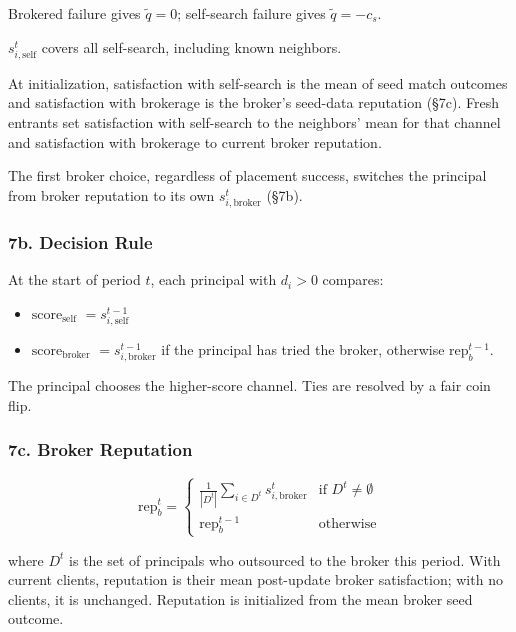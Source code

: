 \documentclass[11pt]{article}
\providecommand{\tightlist}{%
  \setlength{\itemsep}{0pt}\setlength{\parskip}{0pt}}
\begin{document}
Brokered failure gives \(\tilde{q}=0\); self-search failure gives \(\tilde{q}=-c_s\).

\(s_{i,\text{self}}^t\) covers all self-search, including known neighbors.

At initialization, satisfaction with self-search is the mean of seed match outcomes and satisfaction with brokerage is the broker's seed-data reputation (§7c). Fresh entrants set satisfaction with self-search to the neighbors' mean for that channel and satisfaction with brokerage to current broker reputation.

The first broker choice, regardless of placement success, switches the principal from broker reputation to its own \(s_{i,\text{broker}}^t\) (§7b).

\subsubsection{7b. Decision Rule}\label{b.-decision-rule}

At the start of period \(t\), each principal with \(d_i > 0\) compares:

\begin{itemize}
\tightlist
\item \textbf{\(\text{score}_{\text{self}}\)} \(= s_{i,\text{self}}^{t-1}\)
\item \textbf{\(\text{score}_{\text{broker}}\)} \(= s_{i,\text{broker}}^{t-1}\) if the principal has tried the broker, otherwise \(\text{rep}_b^{t-1}\).
\end{itemize}

The principal chooses the higher-score channel. Ties are resolved by a fair coin flip.

\subsubsection{7c. Broker Reputation}\label{c.-broker-reputation}

\[\text{rep}_b^{t} = \begin{cases} \frac{1}{|D^t|} \sum_{i \in D^t} s_{i,\text{broker}}^{t} & \text{if } D^t \neq \emptyset \\[4pt] \text{rep}_b^{t-1} & \text{otherwise} \end{cases}\]

where \(D^t\) is the set of principals who outsourced to the broker this period. With current clients, reputation is their mean post-update broker satisfaction; with no clients, it is unchanged. Reputation is initialized from the mean broker seed outcome.
\end{document}
